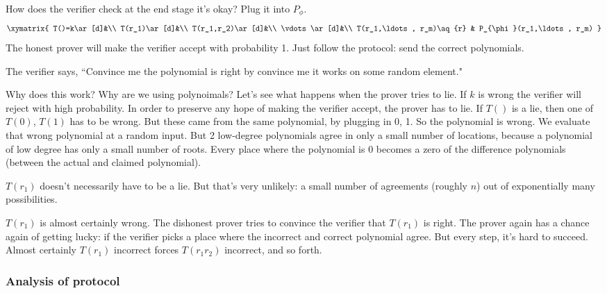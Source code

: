 How does the verifier check at the end stage it's okay? Plug it into $P_{\phi}$.
\[
\xymatrix{
T()=k\ar[d]&\\
T(r_1)\ar[d]&\\
T(r_1,r_2)\ar[d]&\\
\vdots \ar[d]&\\
T(r_1,\ldots, r_m)\aq{r} & P_{\phi}(r_1,\ldots, r_m)
}
\]
The honest prover will make the verifier accept with probability 1. Just follow the protocol: send the correct polynomials.

The verifier says, ``Convince me the polynomial is right by convince me it works on some random element."

Why does this work? Why are we using polynoimals? Let's see what happens when the prover tries to lie. If $k$ is wrong the verifier will reject with high probability. In order to preserve any hope of making the verifier accept, the prover has to lie. If $T()$ is a lie, then one of $T(0)$, $T(1)$ has to be wrong. But these came from the same polynomial, by plugging in 0, 1. So the polynomial is wrong. We evaluate that wrong polynomial at a random input.
But 2 low-degree polynomials agree in only a small number of locations, because a polynomial of low degree has only a small number of roots. 
Every place where the polynomial is 0 becomes a zero of the difference polynomials (between the actual and claimed polynomial).

$T(r_1)$ doesn't necessarily have to be a lie. But that's very unlikely: a small number of agreements (roughly $n$) out of exponentially many possibilities.

$T(r_1)$ is almost certainly wrong. %
The dishonest prover tries to convince the verifier that $T(r_1)$ is right. %
The prover again has a chance again of getting lucky: if the verifier picks a place where the incorrect and correct polynomial agree. But every step, it's hard to succeed. Almost certainly $T(r_1)$ incorrect forces $T(r_1r_2)$ incorrect, and so forth.


\subsubsection{Analysis of protocol}

